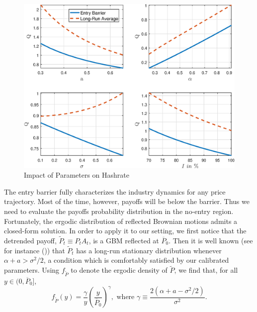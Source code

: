 \documentclass[12pt, a4paper]{article}
\begin{document}
\begin{figure}[]
\caption{Impact of Parameters on Hashrate}
\label{fig:Q_comp_stats}\centering
\includegraphics[scale=0.7]{images/Fig_Q_comp_stats.eps}
\end{figure}



The entry barrier fully characterizes the industry dynamics for any price trajectory.
Most of the time, however, payoffs will be below the barrier.
Thus we need to evaluate the payoffs probability distribution
in the no-entry region. Fortunately, the ergodic distribution of
reflected Brownian motions admits a closed-form solution. In order to apply it to our setting,
we first notice that the detrended payoff, $\tilde{P}_t \equiv P_tA_t$, is a GBM reflected at $\overline{P}_0$.
Then it is well known (see for instance \citeauthor{Grenadier2002} (\citeyear{Grenadier2002})) that
$\tilde{P}_t$ has a long-run stationary distribution whenever $\alpha+a>\sigma^2/2$, a condition
which is comfortably satisfied by our calibrated parameters. Using $f_{\tilde{P}}$ to denote
the ergodic density of $\tilde{P}$, we find that, for all $y\in (0,\overline{P}_0]$,
\begin{equation*}
f_{\tilde{P}}(y)=\frac{\gamma}{y}\left(\frac{y}{\overline{P}_0}\right)^{\gamma}, \text{ where } \gamma \equiv \frac{2\left(\alpha+a-\sigma^2/2\right)}{\sigma^2}.
\end{equation*}
\end{document}
